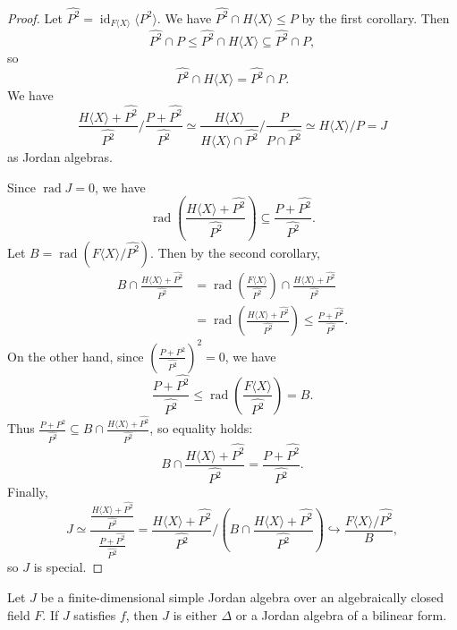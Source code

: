\documentclass{article}
\begin{document}
\begin{proof}
Let $\widehat{P^2}=\operatorname{id}_{F\langle X\rangle}\langle P^2\rangle$. We have $\widehat{P^2}\cap H\langle X\rangle\leq P$ by the first corollary. Then
\[
\widehat{P^2}\cap P\leq\widehat{P^2}\cap H\langle X\rangle\subseteq\widehat{P^2}\cap P,
\]
so
\[
\widehat{P^2}\cap H\langle X\rangle=\widehat{P^2}\cap P.
\]
We have
\[
\frac{H\langle X\rangle+\widehat{P^2}}{\widehat{P^2}}\Big/\frac{P+\widehat{P^2}}{\widehat{P^2}}\simeq\frac{H\langle X\rangle}{H\langle X\rangle\cap\widehat{P^2}}\Big/\frac{P}{P\cap\widehat{P^2}}\simeq H\langle X\rangle/P=J
\]
as Jordan algebras.

Since $\operatorname{rad}J=0$, we have
\[
\operatorname{rad}\left(\frac{H\langle X\rangle+\widehat{P^2}}{\widehat{P^2}}\right)\subseteq\frac{P+\widehat{P^2}}{\widehat{P^2}}.
\]
Let $B=\operatorname{rad}\left(F\langle X\rangle/\widehat{P^2}\right)$. Then by the second corollary,
\begin{align*}
B\cap\frac{H\langle X\rangle+\widehat{P^2}}{\widehat{P^2}}&=\operatorname{rad}\left(\frac{F\langle X\rangle}{\widehat{P^2}}\right)\cap\frac{H\langle X\rangle+\widehat{P^2}}{\widehat{P^2}}\\
&=\operatorname{rad}\left(\frac{H\langle X\rangle+\widehat{P^2}}{\widehat{P^2}}\right)\leq\frac{P+\widehat{P^2}}{\widehat{P^2}}.
\end{align*}
On the other hand, since $\left(\frac{P+\widehat{P^2}}{\widehat{P^2}}\right)^2=0$, we have
\[
\frac{P+\widehat{P^2}}{\widehat{P^2}}\leq\operatorname{rad}\left(\frac{F\langle X\rangle}{\widehat{P^2}}\right)=B.
\]
Thus $\frac{P+\widehat{P^2}}{\widehat{P^2}}\subseteq B\cap\frac{H\langle X\rangle+\widehat{P^2}}{\widehat{P^2}}$, so equality holds:
\[
B\cap\frac{H\langle X\rangle+\widehat{P^2}}{\widehat{P^2}}=\frac{P+\widehat{P^2}}{\widehat{P^2}}.
\]
Finally,
\[
J\simeq\frac{\frac{H\langle X\rangle+\widehat{P^2}}{\widehat{P^2}}}{\frac{P+\widehat{P^2}}{\widehat{P^2}}}=\frac{H\langle X\rangle+\widehat{P^2}}{\widehat{P^2}}\Big/\left(B\cap\frac{H\langle X\rangle+\widehat{P^2}}{\widehat{P^2}}\right)\hookrightarrow\frac{F\langle X\rangle/\widehat{P^2}}{B},
\]
so $J$ is special.
\end{proof}

\begin{lemma}
Let $J$ be a finite-dimensional simple Jordan algebra over an algebraically closed field $F$. If $J$ satisfies $f$, then $J$ is either $\Delta$ or a Jordan algebra of a bilinear form.
\end{lemma}
\end{document}
